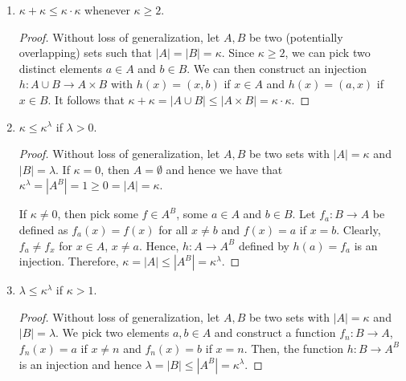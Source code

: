 \begin{enumerate}
    \begin{proof}
    Without loss of generalization, let $A_1, A_2, B_1, B_2$ be   sets such that $|A_1| = \kappa_1$, $|A_2| = \kappa_2$, $|B_1| = \lambda_1$, $|B_2| = \lambda_2$. Since $\kappa_1 \leq \kappa_2$, there is an injection $f: A_1 \rightarrow B_1$. Similarly, since $\lambda_1 \leq \lambda_2$ there is an injection $g: B_1 \rightarrow B_2$. We can therefore construct an injection $h : A_1 \times B_1 \rightarrow A_2 \times B_2$ defined by $h((a,b)) = (f(a), g(b))$. This implies that $\kappa_1 \cdot \lambda_1 = |A_1 \times B_1| \leq |A_2 \times B_2| = \kappa_2 \cdot \lambda_2$.
    \end{proof}
    
    \item $\kappa + \kappa \leq \kappa \cdot \kappa$ whenever $\kappa \geq 2$.
    
    \begin{proof}
    Without loss of generalization, let $A,B$ be two (potentially overlapping) sets such that $|A| = |B| = \kappa$. Since $\kappa \geq 2$, we can pick two distinct elements $a\in A$ and $b \in B$. We can then construct an injection $h: A \cup B \rightarrow A \times B$ with $h(x) = (x, b)$ if $x \in A$ and $h(x) = (a, x)$ if $x \in B$. It follows that $\kappa + \kappa = |A \cup B| \leq |A \times B| = \kappa \cdot \kappa$. 
    \end{proof}
    
    \item $\kappa \leq \kappa^\lambda$ if $\lambda > 0$.
     \begin{proof}
    Without loss of generalization, let $A,B$ be two sets with $|A| = \kappa$ and $|B| = \lambda$. If $\kappa = 0$, then $A = \emptyset$ and hence we have that $\kappa^\lambda = |A^B| = 1 \geq 0 = |A| = \kappa$.
    
    If $\kappa \neq 0$, then pick some $f \in A^B$, some $a \in A$ and $b \in B$. Let $f_a: B \rightarrow A$ be defined as $f_a(x) = f(x)$ for all $x \neq b$  and $f(x) = a$ if $x = b$. Clearly, $f_a \neq f_x$ for $x \in A$, $x \neq a$. Hence, $h: A \rightarrow A^B$ defined by $h(a) = f_a$ is an injection. Therefore, $\kappa = |A| \leq |A^B| = \kappa^\lambda$.

    \end{proof}
    
    \item $\lambda \leq \kappa^\lambda$ if $\kappa > 1$.
    \begin{proof}
    Without loss of generalization, let $A,B$ be two sets with $|A| = \kappa$ and $|B| = \lambda$. We pick two elements $a,b \in A$ and construct a function $f_n: B \rightarrow A$, $f_n(x)=a$ if $x \neq n$ and $f_n(x) = b$ if $x = n$. Then, the function $h: B \rightarrow A^B$ is an injection and hence $\lambda = |B| \leq |A^B| = \kappa^\lambda$.
    \end{proof}
    

\end{enumerate}
